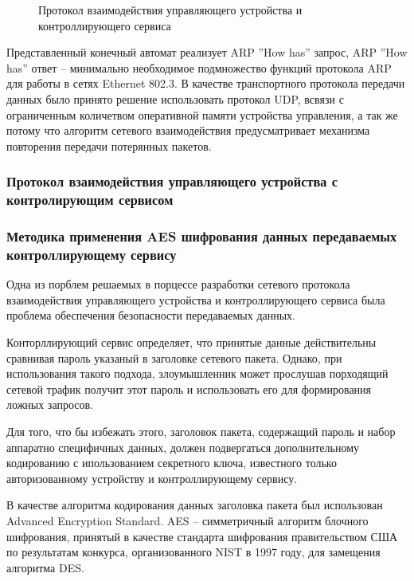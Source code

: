 \begin{figure}[h]
	\caption{Протокол взаимодействия управляющего устройства и контроллирующего сервиса}
	\label{img:devProto}
\end{figure}

Представленный конечный автомат реализует ARP ''How has'' запрос, ARP ''How has'' ответ --
минимально необходимое подмножество функций протокола ARP для работы в сетях Ethernet 802.3.
В качестве транспортного протокола передачи данных было принято решение использовать
протокол UDP, всвязи с ограниченным количетвом оперативной памяти устройства управления, а так же
потому что алгоритм сетевого взаимодействия  предусматривает механизма повторения передачи
потерянных пакетов.

\subsubsection{Протокол взаимодействия управляющего устройства с контролирующим сервисом}

\subsubsection{Методика применения AES шифрования данных передаваемых
контроллирующему сервису}
Одна из порблем решаемых в порцессе разработки сетевого протокола 
взаимодействия управляющего устройства и контроллирующего сервиса
была проблема обеспечения безопасности передаваемых данных.


Конторллирующий сервис определяет, что принятые данные действительны
сравнивая пароль указаный в заголовке сетевого пакета. Однако,
при использования такого подхода, злоумышленник может прослушав
порходящий сетевой трафик получит этот пароль и использовать его
для формирования ложных запросов.


Для того, что бы избежать этого, заголовок пакета, содержащий пароль
и набор аппаратно специфичных данных, должен подвергаться дополнительному
кодированию с ипользованием секретного ключа, известного только
авторизованному устройству и контроллирующему сервису.


В качестве алгоритма кодирования данных заголовка пакета был использован
Advanced Encryption Standard. AES -- симметричный алгоритм блочного
шифрования, принятый в качестве стандарта шифрования правительством США
по результатам конкурса, организованного NIST в 1997 году, для замещения
алгоритма DES.


